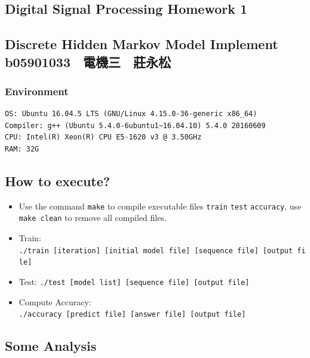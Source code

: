 \documentclass[]{article}
\date{}
\begin{document}
\begin{CJK*}{UTF8}{bsmi}
\hypertarget{header-n0}{%
\section{Digital Signal Processing Homework 1}\label{header-n0}}

\hypertarget{header-n3}{%
\subsection{Discrete Hidden Markov Model Implement　　　　　　　b05901033　電機三　莊永松}\label{header-n3}}

\hypertarget{header-n4}{%
\subsubsection{Environment}\label{header-n4}}

\begin{verbatim}
OS: Ubuntu 16.04.5 LTS (GNU/Linux 4.15.0-36-generic x86_64)
Compiler: g++ (Ubuntu 5.4.0-6ubuntu1~16.04.10) 5.4.0 20160609
CPU: Intel(R) Xeon(R) CPU E5-1620 v3 @ 3.50GHz
RAM: 32G
\end{verbatim}

\hypertarget{header-n6}{%
\subsection{How to execute?}\label{header-n6}}

\begin{itemize}
\item
  Use the command \texttt{make} to compile executable files
  \texttt{train} \texttt{test} \texttt{accuracy}, use
  \texttt{make\ clean} to remove all compiled files.
\item
  Train:
  \texttt{./train\ {[}iteration{]}\ {[}initial\ model\ file{]}\ {[}sequence\ file{]}\ {[}output\ file{]}}
\item
  Test:
  \texttt{./test\ {[}model\ list{]}\ {[}sequence\ file{]}\ {[}output\ file{]}}
\item
  Compute Accuracy:
  \texttt{./accuracy\ {[}predict\ file{]}\ {[}answer\ file{]}\ {[}output\ file{]}}
\end{itemize}

\hypertarget{header-n16}{%
\subsection{Some Analysis}\label{header-n16}}


\end{CJK*}
\end{document}
